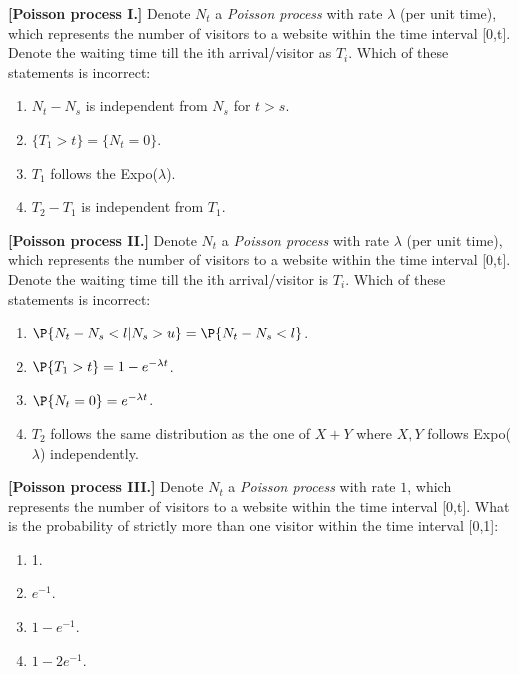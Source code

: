 \documentclass[poll_tutorial_format]{subfiles}
\begin{document}
	
	\begin{exercise}
	\textbf{[Poisson process I.]} Denote $N_t$ a \textit{Poisson process} with rate $\lambda$ (per unit time), which represents the number of visitors to a website within the time interval [0,t]. Denote the waiting time till the ith arrival/visitor as $T_i$. Which of these statements is incorrect: 
		\begin{enumerate}
			\item $N_t-N_s$ is independent from $N_s$ for $t>s$. 
			\item $\{T_1> t\}=\{N_t=0\}$.
			\item $T_1$ follows the Expo($\lambda$).
			\item $T_2-T_1$ is independent from $T_1$.
		\end{enumerate}
	\end{exercise}
	
	
	\begin{exercise}
	\textbf{[Poisson process II.]} Denote $N_t$ a \textit{Poisson process} with rate $\lambda$ (per unit time), which represents the number of visitors to a website within the time interval [0,t]. Denote the waiting time till the ith arrival/visitor is $T_i$. Which of these statements is incorrect: 
	\begin{enumerate}
		\item $\P{N_t-N_s <l|N_s>u}=\P{N_t-N_s <l}$. 
		\item $\P{T_1> t}= 1-e^{-\lambda t}$.
		\item $\P{N_t=0} = e^{-\lambda t}$.
		\item $T_2$ follows the same distribution as the one of $X+Y$ where $X,Y$ follows Expo($\lambda$) independently.
	\end{enumerate}
\end{exercise}
	
	

	\begin{exercise}
	\textbf{[Poisson process III.]} Denote $N_t$ a \textit{Poisson process} with rate $1$, which represents the number of visitors to a website within the time interval [0,t]. What is the probability of strictly more than one visitor within the time interval [0,1]: 
	\begin{enumerate}
		\item 1.
		\item $e^{-1}$.
		\item $1-e^{-1}$.
		\item $1-2e^{-1}$.
 	\end{enumerate}
\end{exercise}
\end{document}
